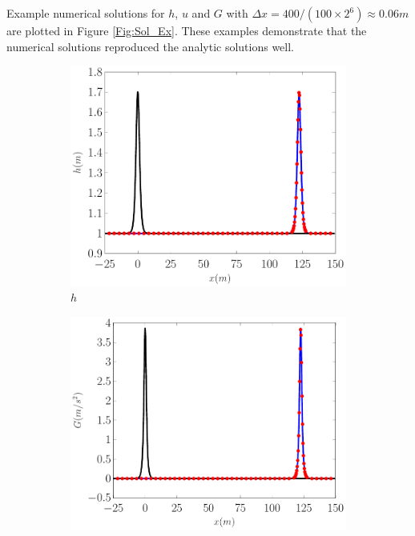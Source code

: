\documentclass[10pt]{elsarticle}
\begin{document}
Example numerical solutions for $h$, $u$ and $G$ with $\Delta x = 400 / (100 \times 2^{6}) \approx 0.06m$ are plotted in Figure \ref{Fig:Sol_Ex}. These examples demonstrate that the numerical solutions reproduced the analytic solutions well.
%
\begin{figure}
	\centering
	\begin{subfigure}{0.32\textwidth}
		\centering
		\includegraphics[width=\textwidth]{./Figures/Simulations/Validation/Serre/hEx.pdf}
		\caption{$h$}
	\end{subfigure}
	\begin{subfigure}{0.32\textwidth}
		\centering
		\includegraphics[width=\textwidth]{./Figures/Simulations/Validation/Serre/GEx.pdf}

\end{subfigure}
\end{figure}
\end{document}
